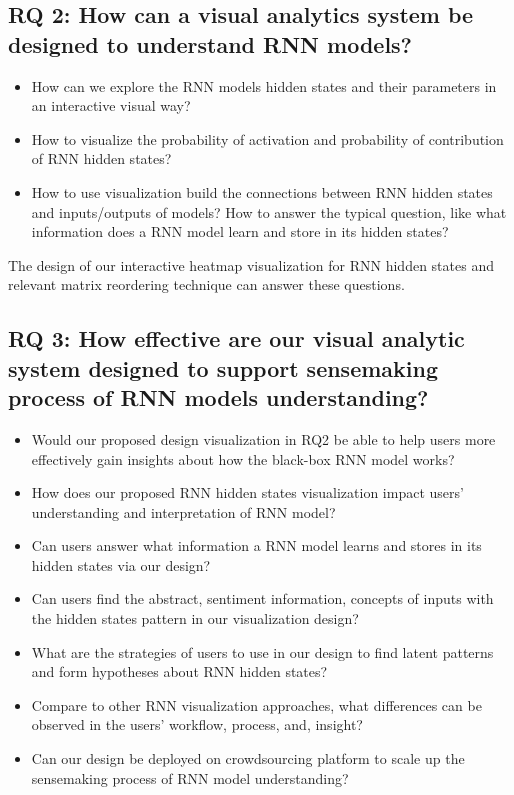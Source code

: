 \subsection{RQ 2: How can a visual analytics system be designed to understand RNN models? }
 
 
\begin{itemize}
    \item How can we explore the RNN models hidden states and their parameters in an interactive visual way?
    \item How to visualize the probability of activation and probability of contribution of RNN hidden states? 
    \item How to use visualization build the connections between RNN hidden states and inputs/outputs of models? How to answer the typical question, like what information does a RNN model learn and store in its hidden states?
\end{itemize}


The design of our interactive heatmap visualization for RNN hidden states and relevant matrix reordering technique can answer these questions. 



\subsection{RQ 3: How effective are our visual analytic system designed to support sensemaking process of RNN models understanding? }

\begin{itemize}
    \item Would our proposed design visualization in RQ2 be able to help users more effectively gain insights about how the black-box RNN model works? 
    \item How does our proposed RNN hidden states visualization impact users’ understanding and interpretation of RNN model?
    \item Can users answer what information a RNN model learns and stores in its hidden states via our design?
    \item Can users find the abstract, sentiment information, concepts of inputs with the hidden states pattern in our visualization design?
    \item What are the strategies of users to use in our design to find latent patterns and form hypotheses about RNN hidden states?
    \item Compare to other RNN visualization approaches\cite{Strobelt2016}, what differences can be observed in the users’ workflow, process, and, insight?
    \item Can our design be deployed on crowdsourcing platform to scale up the sensemaking process of RNN model understanding?

\end{itemize}

